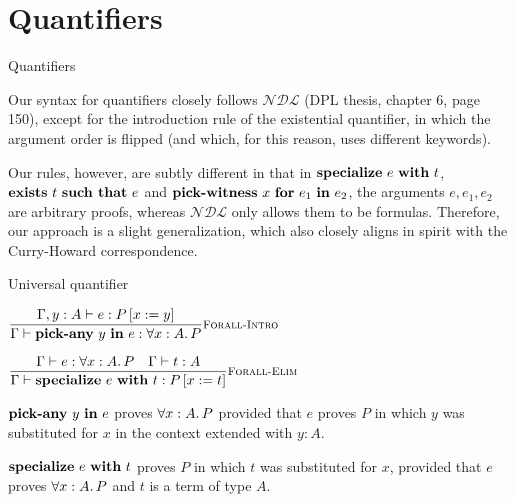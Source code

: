 \documentclass{beamer}
\newcommand{\NDL}{\mathcal{NDL}}
\begin{document}
\section{Quantifiers}

\begin{frame}{Quantifiers}

Our syntax for quantifiers closely follows $\NDL$ (DPL thesis, chapter 6, page 150), except for the introduction rule of the existential quantifier, in which the argument order is flipped (and which, for this reason, uses different keywords).

\vspace{2em}

Our rules, however, are subtly different in that in $\textbf{specialize}\ e\ \textbf{with}\ t$, $\exintro{t}{e}$ and $\textbf{pick-witness}\ x\ \textbf{for}\ e_1\ \textbf{in}\ e_2$, the arguments $e, e_1, e_2$ are arbitrary proofs, whereas $\NDL$ only allows them to be formulas. Therefore, our approach is a slight generalization, which also closely aligns in spirit with the Curry-Howard correspondence.

\end{frame}

\begin{frame}{Universal quantifier}

\begin{center}
  $\infrule[Forall-Intro]{\proves[\extend{\Gamma}{y}{A}]{e}{\subst{P}{x}{y}}}{\proves{\allintro{y}{e}}{\All{x}[A]{P}}}$

  \vspace{2em}

  $\infrule[Forall-Elim]{\proves{e}{\All{x}[A]{P}} \quad \typing{t}{A}}{\proves{\allelim{e}{t}}{\subst{P}{x}{t}}}$
\end{center}

\vspace{2em}

$\allintro{y}{e}$ proves $\All{x}[A]{P}$ provided that $e$ proves $P$ in which $y$ was substituted for $x$ in the context extended with $y : A$.

\vspace{2em}

$\textbf{specialize}\ e\ \textbf{with}\ t$ proves $P$ in which $t$ was substituted for $x$, provided that $e$ proves $\All{x}[A]{P}$ and $t$ is a term of type $A$.

\end{frame}
\end{document}
